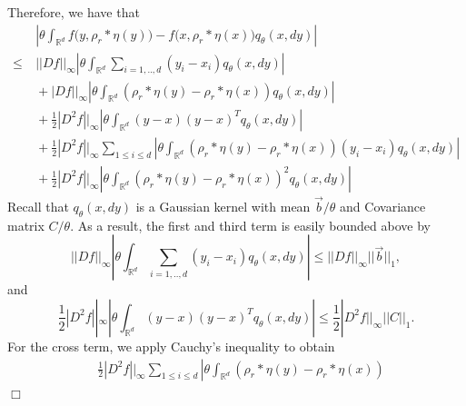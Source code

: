 \documentclass[12pt]{article}
\newenvironment {proof}{{\noindent\bf Proof }}{\hfill $\Box$ \medskip}
\newcommand{\meanq}{\vec b}    %
\newcommand{\covq}{C}     %
\begin{document}
\begin{proof}
Therefore, we have that 
\begin{equation}
\begin{aligned}
&~\left| 
        \theta \int_{\mathbb{R}^d}
                f\big(y,\rho_{r}*\eta(y)\big)-f\big(x,\rho_{r}*\eta(x)\big)
                q_{\theta}(x,dy)
\right|\\
\leq &~ ||Df||_{\infty} \left|
                        \theta \int_{\mathbb{R}^d} \sum_{i=1,..,d}(y_i-x_i) q_{\theta}(x,dy)
                        \right|\\ 
        &~ + |Df||_{\infty} 
            \left| \theta \int_{\mathbb{R}^d}
               \left(\rho_{r}*\eta(y)-\rho_{r}*\eta(x)\right)
            q_{\theta}(x,dy) \right| \\
        &~ + \frac{1}{2}|D^2f||_{\infty}\left|
                        \theta \int_{\mathbb{R}^d} (y-x)(y-x)^{T} q_{\theta}(x,dy)
                        \right|\\
        &~ + \frac{1}{2}|D^2f||_{\infty}    
                \sum_{1 \leq i \leq d}\left|
                        \theta \int_{\mathbb{R}^d}
                        \left(\rho_{r}*\eta(y)-\rho_{r}*\eta(x)\right)
                  (y_i-x_i)
                        q_{\theta}(x,dy)
                        \right|
                    \\
        &~ + \frac{1}{2}|D^2f||_{\infty} \left|
            \theta \int_{\mathbb{R}^d}
            \left(\rho_{r}*\eta(y)-\rho_{r}*\eta(x)
            \right)^2
            q_\theta(x,dy) \right|
\end{aligned}    
\end{equation}
Recall that $q_{\theta}(x,dy)$ is a Gaussian kernel
with mean $\meanq/\theta$
and Covariance matrix $\covq / \theta$.
As a result, the first and third term
is easily bounded above by 
$$||Df||_{\infty} \left|
                        \theta \int_{\mathbb{R}^d} \sum_{i=1,..,d}(y_i-x_i) q_{\theta}(x,dy)
                        \right|
                        \leq  ||Df||_{\infty}||\meanq||_{1},$$
and 
$$ \frac{1}{2}|D^2f||_{\infty}\left|
                        \theta \int_{\mathbb{R}^d} (y-x)(y-x)^{T} q_{\theta}(x,dy)
                        \right| \leq \frac{1}{2}|D^2f||_{\infty} ||\covq||_{1}.$$
For the cross term, we apply Cauchy's inequality to obtain
\begin{equation}
\begin{aligned}
&\frac{1}{2}|D^2f||_{\infty}\sum_{1 \leq i \leq d}    
                \left|
                        \theta \int_{\mathbb{R}^d}
                        \left(\rho_{r}*\eta(y)-\rho_{r}*\eta(x)\right)

\end{aligned}
\end{equation}
\end{proof}
\end{document}
